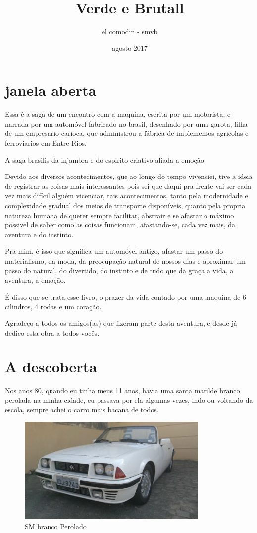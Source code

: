 \documentclass[a4paper]{report}
\title{Verde e Brutall}
\author{el comodin - smvb}
\date{ agosto 2017}
\begin{document}
 
\maketitle
 
\tableofcontents
\clearpage
{}
\section*{janela aberta}
Essa \'e a saga de um encontro com a maquina, escrita por um motorista, e narrada por um autom\'ovel 
fabricado no brasil, desenhado por uma garota, filha de um empresario carioca, que administrou a f\'abrica de
 implementos agricolas e ferroviarios em Entre Rios.

A saga brasilis da injambra e do espirito criativo aliada a emo\c{c}\~ao

Devido aos diversos acontecimentos, que ao longo do tempo vivenciei, tive a ideia de 
registrar as coisas mais interessantes pois sei que daqui pra frente vai ser cada vez mais dif\'icil algu\'em vicenciar,
tais acontecimentos, tanto pela modernidade e complexidade gradual dos meios de transporte dispon\'iveis, quanto pela propria
natureza humana de querer sempre facilitar, abstrair e se afastar o m\'aximo possivel de saber como as coisas funcionam,
afastando-se, cada vez mais, da aventura e do instinto.

Pra mim, \'e isso que significa um autom\'ovel antigo, afastar um passo do materialismo, da moda, da preocupa\c{c}\~ao natural de nossos dias
e aproximar um passo do natural, do divertido, do instinto e de tudo que da gra\c{c}a a vida, a aventura, a emo\c{c}\~ao.

\'E disso que se trata esse livro, o prazer da vida contado por uma maquina de 6 cilindros, 4 rodas e um cora\c{c}\~ao.

Agrade\c{c}o a todos os amigos(as) que fizeram parte desta aventura, e desde j\'a dedico esta obra a todos voc\^es.
\clearpage
{}
\section*{A descoberta}
Nos anos 80, quando eu tinha meus 11 anos, havia uma santa matilde branco perolada na minha cidade,
eu passava por ela algumas vezes, indo ou voltando da escola, sempre achei o carro mais bacana de todos.

\begin{figure}[!htb]
\centering
\includegraphics{sm_bco_per}
\caption{SM branco Perolado}
\label{sm_bco}
\end{figure}
\end{document}

